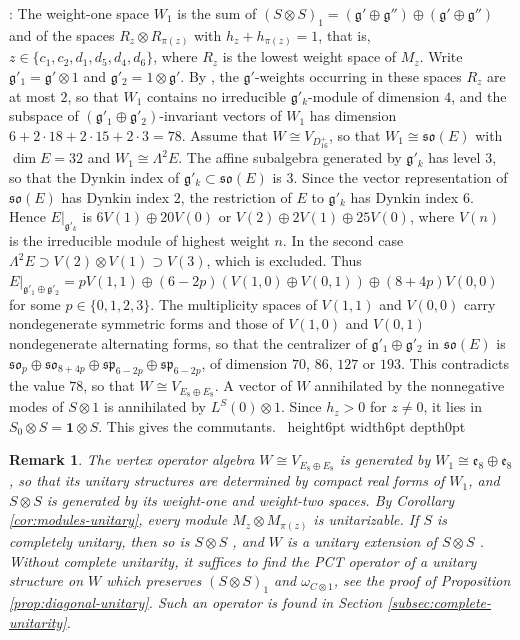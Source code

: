 \documentclass[leqno]{article}
\newcommand{\qed}{\hfill \vrule height6pt  width6pt depth0pt}
\newcommand{\ot}{\otimes}
\newtheorem{remark}[thm]{Remark}
\newenvironment{proof}[1][]{\noindent {\it Proof #1} : }{\hbox{~}\qed
\smallskip
}
\numberwithin{equation}{section}
\begin{document}
\begin{proof}
The weight-one space $W_1$ is the sum of $(S \ot S)_1 = (\mathfrak g' \oplus \mathfrak g'') \oplus (\mathfrak g' \oplus \mathfrak g'')$ and of the spaces $R_z \ot R_{\pi(z)}$ with $h_z+h_{\pi(z)} = 1$, that is, $z \in \{c_1,c_2,d_1,d_5,d_4,d_6\}$, where $R_z$ is the lowest weight space of $M_z$. Write $\mathfrak g'_1 = \mathfrak g' \ot 1$ and $\mathfrak g'_2 = 1 \ot \mathfrak g'$. By \cite[Theorem 8.5 and Table 2]{Arh26}, the $\mathfrak g'$-weights occurring in these spaces $R_z$ are at most $2$, so that $W_1$ contains no irreducible $\mathfrak g'_k$-module of dimension $4$, and the subspace of $(\mathfrak g'_1 \oplus \mathfrak g'_2)$-invariant vectors of $W_1$ has dimension $6+2 \cdot 18+2 \cdot 15+2 \cdot 3 = 78$. Assume that $W \cong V_{D_{16}^+}$, so that $W_1 \cong \mathfrak{so}(E)$ with $\dim E = 32$ and $W_1 \cong \Lambda^2 E$. The affine subalgebra generated by $\mathfrak g'_k$ has level $3$, so that the Dynkin index of $\mathfrak g'_k \subset \mathfrak{so}(E)$ is $3$. Since the vector representation of $\mathfrak{so}(E)$ has Dynkin index $2$, the restriction of $E$ to $\mathfrak g'_k$ has Dynkin index $6$. Hence $E|_{\mathfrak g'_k}$ is $6V(1) \oplus 20V(0)$ or $V(2) \oplus 2V(1) \oplus 25V(0)$, where $V(n)$ is the irreducible module of highest weight $n$. In the second case $\Lambda^2 E \supset V(2) \ot V(1) \supset V(3)$, which is excluded. Thus $E|_{\mathfrak g'_1 \oplus \mathfrak g'_2} = pV(1,1) \oplus (6-2p)(V(1,0) \oplus V(0,1)) \oplus (8+4p)V(0,0)$ for some $p \in \{0,1,2,3\}$. The multiplicity spaces of $V(1,1)$ and $V(0,0)$ carry nondegenerate symmetric forms and those of $V(1,0)$ and $V(0,1)$ nondegenerate alternating forms, so that the centralizer of $\mathfrak g'_1 \oplus \mathfrak g'_2$ in $\mathfrak{so}(E)$ is $\mathfrak{so}_p \oplus \mathfrak{so}_{8+4p} \oplus \mathfrak{sp}_{6-2p} \oplus \mathfrak{sp}_{6-2p}$, of dimension $70$, $86$, $127$ or $193$. This contradicts the value $78$, so that $W \cong V_{E_8 \oplus E_8}$.
A vector of $W$ annihilated by the nonnegative modes of $S \ot 1$ is annihilated by $L^S(0) \ot 1$. Since $h_z > 0$ for $z \neq 0$, it lies in $S_0 \ot S = \mathbf 1 \ot S$. This gives the commutants.
\end{proof}

\begin{remark}\normalfont
The vertex operator algebra $W \cong V_{E_8 \oplus E_8}$ is generated by $W_1 \cong \mathfrak e_8 \oplus \mathfrak e_8$, so that its unitary structures are determined by compact real forms of $W_1$, and $S \ot S$ is generated by its weight-one and weight-two spaces. By Corollary \ref{cor:modules-unitary}, every module $M_z \ot M_{\pi(z)}$ is unitarizable. If $S$ is completely unitary, then so is $S \ot S$ \cite[Proposition 3.31 p.~48]{Gui22}, and $W$ is a unitary extension of $S \ot S$ \cite[Theorem 4.7 p.~19]{CGGH23}. Without complete unitarity, it suffices to find the PCT operator of a unitary structure on $W$ which preserves $(S \ot S)_1$ and $\omega_{C \ot 1}$, see the proof of Proposition \ref{prop:diagonal-unitary}. Such an operator is found in Section \ref{subsec:complete-unitarity}.
\end{remark}
\end{document}
